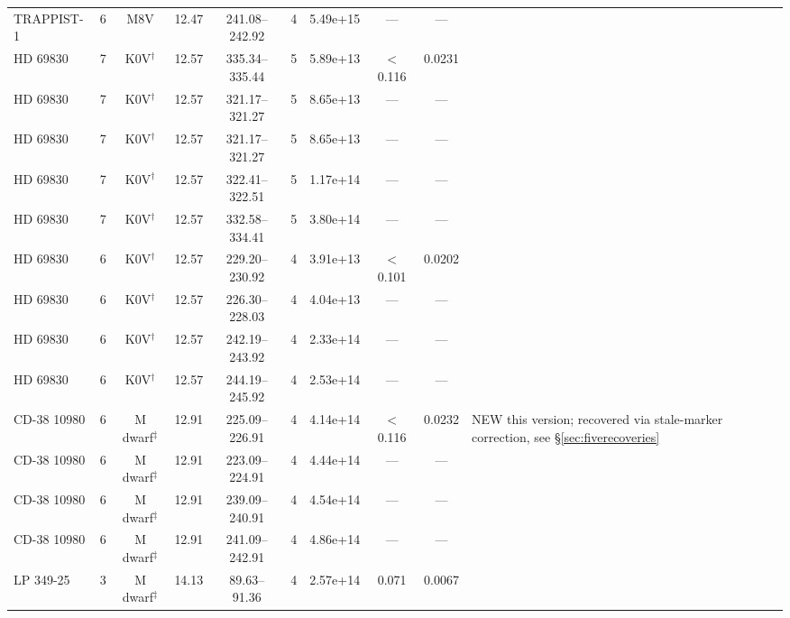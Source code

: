 \documentclass{openjournal}
\begin{document}
\begin{table}
\begin{tabularx}{\textwidth}{@{}l c c c c c c c c X@{}}
TRAPPIST-1 & 6 & M8V & 12.47 & 241.08--242.92 & 4 & 5.49e+15 & --- & --- &  \\
HD 69830 & 7 & K0V$^\dagger$ & 12.57 & 335.34--335.44 & 5 & 5.89e+13 & $<$0.116 & 0.0231 &  \\
HD 69830 & 7 & K0V$^\dagger$ & 12.57 & 321.17--321.27 & 5 & 8.65e+13 & --- & --- &  \\
HD 69830 & 7 & K0V$^\dagger$ & 12.57 & 321.17--321.27 & 5 & 8.65e+13 & --- & --- &  \\
HD 69830 & 7 & K0V$^\dagger$ & 12.57 & 322.41--322.51 & 5 & 1.17e+14 & --- & --- &  \\
HD 69830 & 7 & K0V$^\dagger$ & 12.57 & 332.58--334.41 & 5 & 3.80e+14 & --- & --- &  \\
HD 69830 & 6 & K0V$^\dagger$ & 12.57 & 229.20--230.92 & 4 & 3.91e+13 & $<$0.101 & 0.0202 &  \\
HD 69830 & 6 & K0V$^\dagger$ & 12.57 & 226.30--228.03 & 4 & 4.04e+13 & --- & --- &  \\
HD 69830 & 6 & K0V$^\dagger$ & 12.57 & 242.19--243.92 & 4 & 2.33e+14 & --- & --- &  \\
HD 69830 & 6 & K0V$^\dagger$ & 12.57 & 244.19--245.92 & 4 & 2.53e+14 & --- & --- &  \\
CD-38 10980 & 6 & M dwarf$^\ddagger$ & 12.91 & 225.09--226.91 & 4 & 4.14e+14 & $<$0.116 & 0.0232 & NEW this version; recovered via stale-marker correction, see \S\ref{sec:fiverecoveries} \\
CD-38 10980 & 6 & M dwarf$^\ddagger$ & 12.91 & 223.09--224.91 & 4 & 4.44e+14 & --- & --- &  \\
CD-38 10980 & 6 & M dwarf$^\ddagger$ & 12.91 & 239.09--240.91 & 4 & 4.54e+14 & --- & --- &  \\
CD-38 10980 & 6 & M dwarf$^\ddagger$ & 12.91 & 241.09--242.91 & 4 & 4.86e+14 & --- & --- &  \\
LP  349-25 & 3 & M dwarf$^\ddagger$ & 14.13 & 89.63--91.36 & 4 & 2.57e+14 & 0.071 & 0.0067 &  \\
\hline
\end{tabularx}
\end{table}
\end{document}
